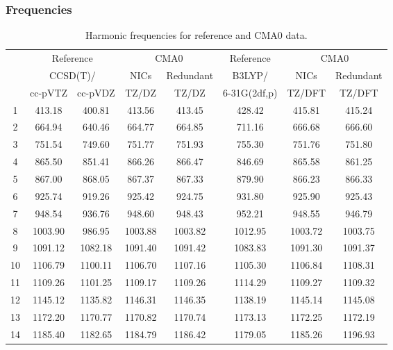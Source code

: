 \documentclass[10pt,oneside]{article}
\begin{document}
\begin{table}[h!]
\subsubsection*{Frequencies}
\centering
\caption{Harmonic frequencies for reference and CMA0 data.}
\begin{tabular}{cccccccc}
\toprule
{} & \multicolumn{2}{c}{Reference} & \multicolumn{2}{c}{CMA0} &    Reference & \multicolumn{2}{c}{CMA0} \\
{} & \multicolumn{2}{c}{CCSD(T)/} &    NICs &  Redundant &       B3LYP/ &    NICs & Redundant \\
{} &   cc-pVTZ & cc-pVDZ &   TZ/DZ &      TZ/DZ & 6-31G(2df,p) &  TZ/DFT &    TZ/DFT \\
\midrule
1  &    413.18 &  400.81 &  413.56 &     413.45 &       428.42 &  415.81 &    415.24 \\
2  &    664.94 &  640.46 &  664.77 &     664.85 &       711.16 &  666.68 &    666.60 \\
3  &    751.54 &  749.60 &  751.77 &     751.93 &       755.30 &  751.76 &    751.80 \\
4  &    865.50 &  851.41 &  866.26 &     866.47 &       846.69 &  865.58 &    861.25 \\
5  &    867.00 &  868.05 &  867.37 &     867.33 &       879.90 &  866.23 &    866.33 \\
6  &    925.74 &  919.26 &  925.42 &     924.75 &       931.80 &  925.90 &    925.43 \\
7  &    948.54 &  936.76 &  948.60 &     948.43 &       952.21 &  948.55 &    946.79 \\
8  &   1003.90 &  986.95 & 1003.88 &    1003.82 &      1012.95 & 1003.72 &   1003.75 \\
9  &   1091.12 & 1082.18 & 1091.40 &    1091.42 &      1083.83 & 1091.30 &   1091.37 \\
10 &   1106.79 & 1100.11 & 1106.70 &    1107.16 &      1105.30 & 1106.84 &   1108.31 \\
11 &   1109.26 & 1101.25 & 1109.17 &    1109.26 &      1114.29 & 1109.27 &   1109.32 \\
12 &   1145.12 & 1135.82 & 1146.31 &    1146.35 &      1138.19 & 1145.14 &   1145.08 \\
13 &   1172.20 & 1170.77 & 1170.82 &    1170.74 &      1173.13 & 1172.25 &   1172.19 \\
14 &   1185.40 & 1182.65 & 1184.79 &    1186.42 &      1179.05 & 1185.26 &   1196.93 \\

\end{tabular}
\end{table}
\end{document}
